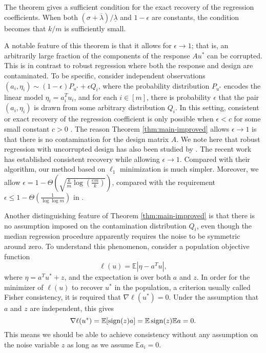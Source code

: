 The theorem gives a sufficient condition for the exact recovery of the regression coefficients. When both $(\sigma+\overline{\lambda})/\underline{\lambda}$ and $1-\epsilon$ are constants, the condition becomes that $k/m$ is sufficiently small.

A notable feature of this theorem is that it allows for $\epsilon \rightarrow 1$; that is, an arbitrarily large fraction of the components of the response $Au^*$ can be corrupted. This is in contrast to robust regression where both the response and design are contaminated. To be specific, consider independent observations $(a_i,\eta_i)\sim (1-\epsilon)P_{u^*}+\epsilon Q_i$, where the probability distribution $P_{u^*}$ encodes the linear model $\eta_i=a_i^Tu_i$, and for each $i\in[m]$, there is probability $\epsilon$ that the pair $(a_i,\eta_i)$ is drawn from some arbitrary distribution $Q_i$. In this setting, consistent or exact recovery of the regression coefficient is only possible when $\epsilon<c$ for some small constant $c>0$ \citep{gao2020}. The reason Theorem \ref{thm:main-improved} allows $\epsilon\rightarrow 1$ is that there is no contamination for the design matrix $A$. We note here that robust regression with uncorrupted design has also been studied by \cite{tsakonas2014convergence,wright,nguyen1,nguyen2,karmalkar2018compressed,bhatia}. The recent work \cite{suggala2019adaptive} has established consistent recovery while allowing $\epsilon\rightarrow 1$. Compared with their algorithm, our method based on $\ell_1$ minimization is much simpler. Moreover, we allow $\epsilon=1-\Theta\left(\sqrt{\frac{k}{m}\log\left(\frac{em}{k}\right)}\right)$, compared with the requirement $\epsilon\leq 1-\Theta\left(\frac{1}{\log\log m}\right)$ in \cite{suggala2019adaptive}.


Another distinguishing feature of Theorem \ref{thm:main-improved} is that there is no assumption imposed on the contamination distribution $Q_i$, even though the median regression procedure apparently requires the noise to be symmetric around zero. To understand this phenomenon, consider a population objective function
$$\ell(u)=\mathbb{E}|\eta - a^Tu|,$$
where $\eta=a^Tu^*+z$, and the expectation is over both $a$ and $z$. In order for the minimizer of $\ell(u)$ to recover $u^*$ in the population, a criterion usually called Fisher consistency, it is required that $\nabla\ell(u^*)=0$. Under the assumption that $a$ and $z$ are independent, this gives
\begin{equation}
\nabla\ell(u^*)=\mathbb{E}[\sgn(z)a]=\mathbb{E}\sgn(z)\mathbb{E}a=0. \label{eq:pop-insight}
\end{equation}
This means we should be able to achieve consistency without any assumption on the noise variable $z$ as long as we assume $\mathbb{E}a_i=0$.

